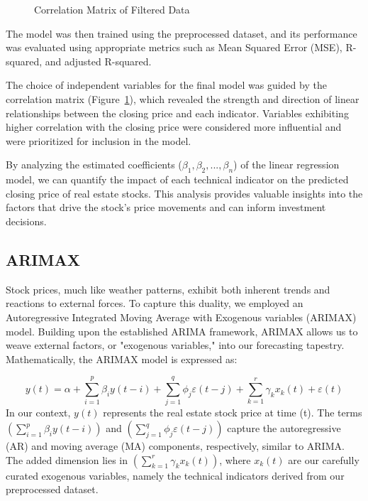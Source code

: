 \documentclass{ieeeojies}
\begin{document}
\begin{figure}[ht]
\centering
  \begin{minipage}{0.5\textwidth}
    \centering
    \caption{Correlation Matrix of Filtered Data}
    \label{tab:correlation_matrix}
  \end{minipage}
\end{figure}


The model was then trained using the preprocessed dataset, and its performance was evaluated using appropriate metrics such as Mean Squared Error (MSE), R-squared, and adjusted R-squared.

The choice of independent variables for the final model was guided by the correlation matrix (Figure~\ref{tab:correlation_matrix}), which revealed the strength and direction of linear relationships between the closing price and each indicator. Variables exhibiting higher correlation with the closing price were considered more influential and were prioritized for inclusion in the model.

By analyzing the estimated coefficients (\( \beta_1, \beta_2, ..., \beta_n \)) of the linear regression model, we can quantify the impact of each technical indicator on the predicted closing price of real estate stocks. This analysis provides valuable insights into the factors that drive the stock's price movements and can inform investment decisions.
  \subsection{ARIMAX}
  Stock prices, much like weather patterns, exhibit both inherent trends and reactions to external forces. To capture this duality, we employed an Autoregressive Integrated Moving Average with Exogenous variables (ARIMAX) model. Building upon the established ARIMA framework, ARIMAX allows us to weave external factors, or "exogenous variables," into our forecasting tapestry.
  Mathematically, the ARIMAX model is expressed as:
  
  \[y(t) = \alpha + \sum_{i=1}^{p} \beta_i y(t-i) + \sum_{j=1}^{q} \phi_j \varepsilon(t-j) + \sum_{k=1}^{r} \gamma_k x_k(t) + \varepsilon(t)\]
In our context, $y(t)$ represents the real estate stock price at time (t). The terms  $(\sum_{i=1}^{p} \beta_i y(t-i))$ and $(\sum_{j=1}^{q} \phi_j \varepsilon(t-j))$ capture the autoregressive (AR) and moving average (MA) components, respectively, similar to ARIMA. The added dimension lies in $(\sum_{k=1}^{r} \gamma_k x_k(t))$, where $x_k(t)$ are our carefully curated exogenous variables, namely the technical indicators derived from our preprocessed dataset.
\end{document}
